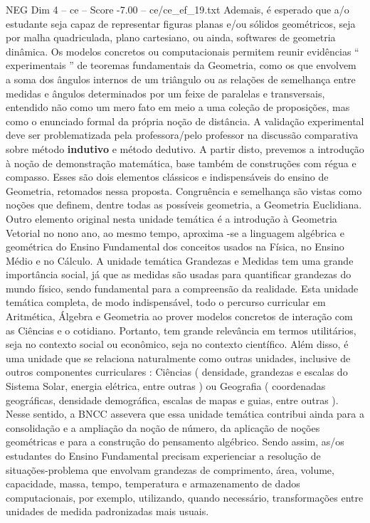 \begin{textsample}{NEG Dim 4 – ce – Score -7.00 – ce/ce\_ef\_19.txt}
Ademais, é esperado que a/o estudante seja capaz de representar figuras planas e/ou sólidos geométricos, seja por malha quadriculada, plano cartesiano, ou ainda, softwares de geometria dinâmica.
Os modelos concretos ou computacionais permitem reunir evidências “ experimentais ” de teoremas fundamentais da Geometria, como os que envolvem a soma dos ângulos internos de um triângulo ou as relações de semelhança entre medidas e ângulos determinados por um feixe de paralelas e transversais, entendido não como um mero fato em meio a uma coleção de proposições, mas como o enunciado formal da própria noção de distância.
A validação experimental deve ser problematizada pela professora/pelo professor na discussão comparativa sobre método \textbf{indutivo} e método dedutivo.
A partir disto, prevemos a introdução à noção de demonstração matemática, base também de construções com régua e compasso.
Esses são dois elementos clássicos e indispensáveis do ensino de Geometria, retomados nessa proposta.
Congruência e semelhança são vistas como noções que definem, dentre todas as possíveis geometria, a Geometria Euclidiana.
Outro elemento original nesta unidade temática é a introdução à Geometria Vetorial no nono ano, ao mesmo tempo, aproxima -se a linguagem algébrica e geométrica do Ensino Fundamental dos conceitos usados na Física, no Ensino Médio e no Cálculo.
A unidade temática Grandezas e Medidas tem uma grande importância social, já que as medidas são usadas para quantificar grandezas do mundo físico, sendo fundamental para a compreensão da realidade.
Esta unidade temática completa, de modo indispensável, todo o percurso curricular em Aritmética, Álgebra e Geometria ao prover modelos concretos de interação com as Ciências e o cotidiano.
Portanto, tem grande relevância em termos utilitários, seja no contexto social ou econômico, seja no contexto científico.
Além disso, é uma unidade que se relaciona naturalmente como outras unidades, inclusive de outros componentes curriculares : Ciências ( densidade, grandezas e escalas do Sistema Solar, energia elétrica, entre outras ) ou Geografia ( coordenadas geográficas, densidade demográfica, escalas de mapas e guias, entre outras ).
Nesse sentido, a BNCC assevera que essa unidade temática contribui ainda para a consolidação e a ampliação da noção de número, da aplicação de noções geométricas e para a construção do pensamento algébrico.
Sendo assim, as/os estudantes do Ensino Fundamental precisam experienciar a resolução de situações-problema que envolvam grandezas de comprimento, área, volume, capacidade, massa, tempo, temperatura e armazenamento de dados computacionais, por exemplo, utilizando, quando necessário, transformações entre unidades de medida padronizadas mais usuais.

\end{textsample}
